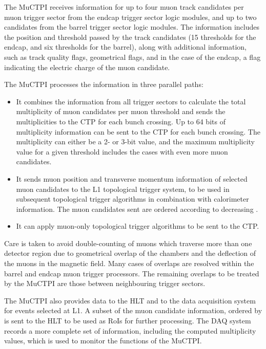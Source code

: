 \documentclass[cernpreprint, atlasdraft=false, UKenglish,british,orcidlogo, texmf, orcidlogo]{atlasdoc}
\begin{document}
The \gls{MuCTPI} receives information for up to four muon track candidates per muon trigger sector from the endcap trigger sector logic modules, and up to two candidates from the barrel trigger sector logic modules.  The information includes the position and \pT threshold passed by the track candidates (15 \pT thresholds for the endcap, and six \pT thresholds for the barrel), along with additional information, such as track quality flags, geometrical flags, and in the case of the endcap, a flag indicating the electric charge of the muon candidate.
 
The \gls{MuCTPI} processes the information in three parallel paths:
 
\begin{itemize}
\item It combines the information from all trigger sectors to calculate the total multiplicity of muon candidates per muon threshold and sends the multiplicities to the \gls{CTP} for each bunch crossing.  Up to 64 bits of multiplicity information can be sent to the \gls{CTP} for each bunch crossing.  The multiplicity can either be a 2- or 3-bit value, and the maximum multiplicity value for a given \pT threshold includes the cases with even more muon candidates.
 
\item It sends muon position and transverse momentum information of selected muon candidates to the \gls{L1} topological trigger system, to be used in subsequent topological trigger algorithms in combination with calorimeter information.  The muon candidates sent are ordered according to decreasing \pT.
 
\item It can apply muon-only topological trigger algorithms to be sent to the \gls{CTP}.
\end{itemize}
 
Care is taken to avoid double-counting of muons which traverse more than one detector region due to geometrical overlap of the chambers and the deflection of the muons in the magnetic field.  Many cases of overlaps are resolved within the barrel and endcap muon trigger processors.  The remaining overlaps to be treated by the \gls{MuCTPI} are those between neighbouring trigger sectors.
 
The \gls{MuCTPI} also provides data to the \gls{HLT} and to the data acquisition system for events selected at \gls{L1}.
A subset of the muon candidate information, ordered by \pT is sent to the  \gls{HLT} to be used as \glspl{RoI} for further processing.  The \gls{DAQ} system records a more complete set of information, including the computed multiplicity values, which is used to monitor the functions of the  \gls{MuCTPI}.
 
\end{document}
